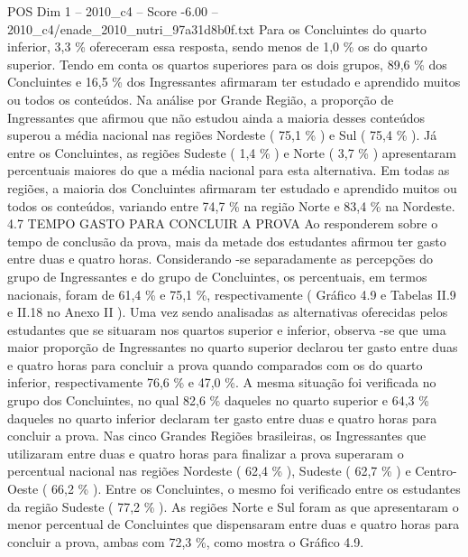 \begin{textsample}{POS Dim 1 – 2010\_c4 – Score -6.00 – 2010\_c4/enade\_2010\_nutri\_97a31d8b0f.txt}
Para os Concluintes do quarto inferior, 3,3 \% ofereceram essa resposta, sendo menos de 1,0 \% os do quarto superior.
Tendo em conta os quartos superiores para os dois grupos, 89,6 \% dos Concluintes e 16,5 \% dos Ingressantes afirmaram ter estudado e aprendido muitos ou todos os conteúdos.
Na análise por Grande Região, a proporção de Ingressantes que afirmou que não estudou ainda a maioria desses conteúdos superou a média nacional nas regiões Nordeste ( 75,1 \% ) e Sul ( 75,4 \% ).
Já entre os Concluintes, as regiões Sudeste ( 1,4 \% ) e Norte ( 3,7 \% ) apresentaram percentuais maiores do que a média nacional para esta alternativa.
Em todas as regiões, a maioria dos Concluintes afirmaram ter estudado e aprendido muitos ou todos os conteúdos, variando entre 74,7 \% na região Norte e 83,4 \% na Nordeste. 4.7 TEMPO GASTO PARA CONCLUIR A PROVA Ao responderem sobre o tempo de conclusão da prova, mais da metade dos estudantes afirmou ter gasto entre duas e quatro horas.
Considerando -se separadamente as percepções do grupo de Ingressantes e do grupo de Concluintes, os percentuais, em termos nacionais, foram de 61,4 \% e 75,1 \%, respectivamente ( Gráfico 4.9 e Tabelas II.9 e II.18 no Anexo II ).
Uma vez sendo analisadas as alternativas oferecidas pelos estudantes que se situaram nos quartos superior e inferior, observa -se que uma maior proporção de Ingressantes no quarto superior declarou ter gasto entre duas e quatro horas para concluir a prova quando comparados com os do quarto inferior, respectivamente 76,6 \% e 47,0 \%.
A mesma situação foi verificada no grupo dos Concluintes, no qual 82,6 \% daqueles no quarto superior e 64,3 \% daqueles no quarto inferior declaram ter gasto entre duas e quatro horas para concluir a prova.
Nas cinco Grandes Regiões brasileiras, os Ingressantes que utilizaram entre duas e quatro horas para finalizar a prova superaram o percentual nacional nas regiões Nordeste ( 62,4 \% ), Sudeste ( 62,7 \% ) e Centro-Oeste ( 66,2 \% ).
Entre os Concluintes, o mesmo foi verificado entre os estudantes da região Sudeste ( 77,2 \% ).
As regiões Norte e Sul foram as que apresentaram o menor percentual de Concluintes que dispensaram entre duas e quatro horas para concluir a prova, ambas com 72,3 \%, como mostra o Gráfico 4.9.

\end{textsample}
